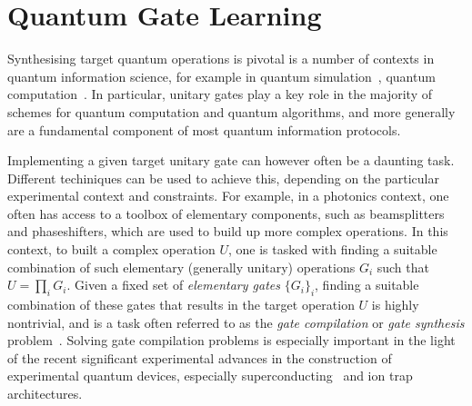 
\chapter{Quantum Gate Learning}
\label{Section:GateLearning}

Synthesising target quantum operations is pivotal is a number of contexts in quantum information science, for example in quantum simulation~\cite{feynman1982simulating,lloyd1996universal}, quantum computation~\cite{feynman1982simulating,deutsch1985quantum,gottesman1998theory,nielsen2002quantum,ladd2010quantum}.
In particular, unitary gates play a key role in the majority of schemes for quantum computation and quantum algorithms, and more generally are a fundamental component of most quantum information protocols.

Implementing a given target unitary gate can however often be a daunting task. Different techiniques can be used to achieve this, depending on the particular experimental context and constraints.
For example, in a photonics context, one often has access to a toolbox of elementary components, such as beamsplitters and phaseshifters, which are used to build up more complex operations.
In this context, to built a complex operation $U$, one is tasked with finding a suitable combination of such elementary (generally unitary) operations $G_i$ such that $U=\prod_i G_i$. Given a fixed set of \textit{elementary gates} $\{G_i\}_i$, finding a suitable combination of these gates that results in the target operation $U$ is highly nontrivial, and is a task often referred to as the \textit{gate compilation} or \textit{gate synthesis} problem~\cite{mottonen2004quantum,nielsen2006quantum,loke2014optqc,loke2016optqc,nakajima2009synthesis,maslov2017basic,swaddle2017generating}. 
Solving gate compilation problems is especially important in the light of the recent significant experimental advances in the construction of experimental quantum devices, especially superconducting~\cite{devoret2013superconducting} and ion trap~\cite{blatt2008entangled,debnath2016demonstration} architectures.

